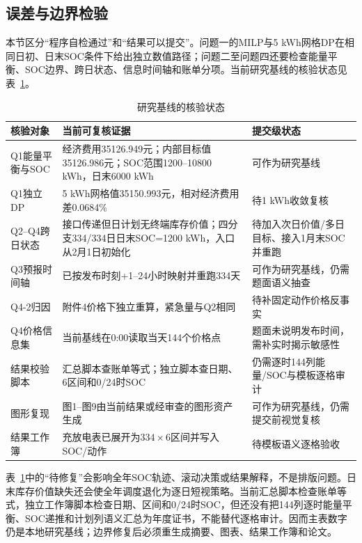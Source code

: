 \documentclass[UTF8,12pt,a4paper]{ctexart}
\begin{document}
\subsection{误差与边界检验}
本节区分“程序自检通过”和“结果可以提交”。问题一的MILP与5 kWh网格DP在相同日初、日末SOC条件下给出独立数值路径；问题二至问题四还要检查能量平衡、SOC边界、跨日状态、信息时间轴和账单分项。当前研究基线的核验状态见表~\ref{tab:audit}。
\begin{table}[H]\centering\small\caption{研究基线的核验状态}\label{tab:audit}
\begin{tabular}{p{.24\linewidth}p{.30\linewidth}p{.34\linewidth}}\toprule
核验对象&当前可复核证据&提交级状态\\\midrule
Q1能量平衡与SOC&经济费用35126.949元；内部目标值35126.986元；SOC范围1200--10800 kWh，日末6000 kWh&可作为研究基线\\
Q1独立DP&5 kWh网格值35150.993元，相对经济费用差0.0684\%&待1 kWh收敛复核\\
Q2--Q4跨日状态&接口传递但日计划无终端库存价值；四分支334/334日日末SOC=1200 kWh，入口从2月1日初始化&待加入次日价值/多日目标、接入1月末SOC并重跑\\
Q3预报时间轴&已按发布时刻+1--24小时映射并重跑334天&可作为研究基线，仍需题面语义抽查\\
Q4-2归因&附件4价格下独立重算，紧急量与Q2相同&待补固定动作价格反事实\\
Q4价格信息集&当前基线在0:00读取当天144个价格点&题面未说明发布时间，需补实时揭示敏感性\\
结果校验脚本&汇总脚本查账单等式；独立脚本查日期、6区间和0/24时SOC&仍需逐时144列能量/SOC与模板逐格审计\\
图形复现&图1--图9由当前结果或经审查的图形资产生成&可作为研究基线，仍需提交前视觉复核\\
结果工作簿&充放电表已展开为\(334\times6\)区间并写入SOC/动作&待模板语义逐格验收\\\bottomrule
\end{tabular}\end{table}
表~\ref{tab:audit}中的“待修复”会影响全年SOC轨迹、滚动决策或结果解释，不是排版问题。日末库存价值缺失还会使全年调度退化为逐日短视策略。当前汇总脚本检查账单等式，独立工作簿脚本检查日期、区间和0/24时SOC，但还没有把144列逐时能量平衡、SOC递推和计划列语义汇总为年度证书，不能替代逐格审计。因而主表数字仍是本地研究基线；边界修复后必须重生成摘要、图表、结果工作簿和论文。
\end{document}
